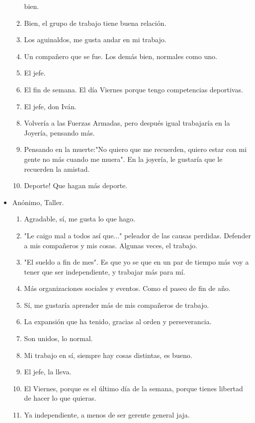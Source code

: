 \begin{itemize}
\begin{enumerate}
        bien.
        \item Bien, el grupo de trabajo tiene buena relación. 
        \item Los aguinaldos, me gusta andar en mi trabajo.
        \item Un compañero que se fue. Los demás bien, normales como uno.
        \item El jefe.
        \item El fin de semana. El día Viernes porque tengo competencias
        deportivas.
        \item El jefe, don Iván.
        \item Volvería a las Fuerzas Armadas, pero después igual trabajaría en
        la Joyería, pensando más.
        \item Pensando en la muerte:"No quiero que me recuerden, quiero estar con mi gente no más
        cuando me muera". En la joyería, le gustaría que le recuerden la
        amistad.
        \item Deporte! Que hagan más deporte.
    \end{enumerate}
    \item Anónimo, Taller.
    \begin{enumerate}
        \item Agradable, sí, me gusta lo que hago.
        \item "Le caigo mal a todos así que..." peleador de las causas
        perdidas. Defender a mis compañeros y mis cosas. Algunas veces, el
        trabajo.
        \item "El sueldo a fin de mes".  Es  que yo se que en un par de tiempo
        más voy a tener que ser independiente, y trabajar más para mí.
        \item Más organizaciones sociales y eventos. Como el paseo de fin de
        año.
        \item Sí, me gustaría aprender más de mis compañeros de trabajo.
        \item La expansión que ha tenido, gracias al orden y perseverancia.
        \item Son unidos, lo normal.
        \item Mi trabajo en sí, siempre hay cosas distintas, es bueno.
        \item El jefe, la lleva.
        \item El Viernes, porque es el último día de la semana, porque tienes
        libertad de hacer lo que quieras.
        \item Ya independiente, a menos de ser gerente general jaja.

\end{enumerate}
\end{itemize}
